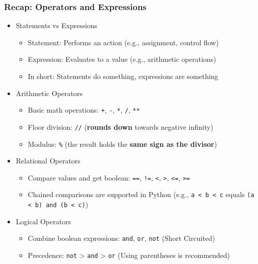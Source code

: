 \documentclass{beamer}
\begin{document}
\begin{frame}
    \frametitle{Recap: Operators and Expressions}
    \begin{itemize}
        \item Statements vs Expressions
              \begin{itemize}
                  \item Statement: Performs an action (e.g., assignment, control flow)
                  \item Expression: Evaluates to a value (e.g., arithmetic operations)
                  \item In short: Statements do something, expressions are something
              \end{itemize}
        \item Arithmetic Operators
              \begin{itemize}
                  \item Basic math operations: \texttt{+}, \texttt{-}, \texttt{*}, \texttt{/}, \texttt{**}
                  \item Floor division: \texttt{//} (\textbf{rounds down} towards negative infinity)
                  \item Modulus: \texttt{\%} (the result holds the \textbf{same sign as the divisor})
              \end{itemize}
        \item Relational Operators
              \begin{itemize}
                  \item Compare values and get boolean: \texttt{==}, \texttt{!=}, \texttt{<}, \texttt{>}, \texttt{<=}, \texttt{>=}
                  \item Chained comparisons are supported in Python
                        (e.g., \texttt{a < b < c} equals \texttt{(a < b) and (b < c)})
              \end{itemize}
        \item Logical Operators
              \begin{itemize}
                  \item Combine boolean expressions: \texttt{and}, \texttt{or}, \texttt{not} (Short Circuited)
                  \item Precedence: \texttt{not} > \texttt{and} > \texttt{or} (Using parentheses is recommended)
              \end{itemize}
    \end{itemize}
\end{frame}
\end{document}
